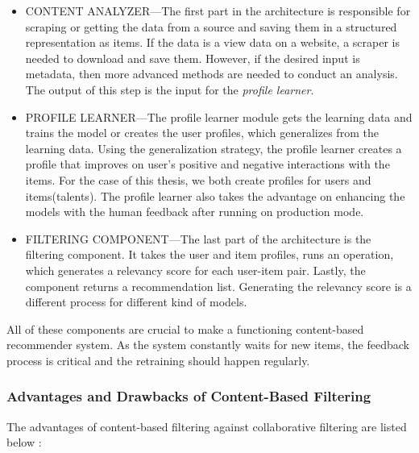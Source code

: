 \begin{itemize}
\item CONTENT ANALYZER—The first part in the architecture is responsible for scraping or getting the data from  a source and saving them in a structured representation as items. If the data is a view data on a website, a scraper is needed to download and save them. However, if the desired input is metadata, then more advanced methods are needed to conduct an analysis. The output of this step is the input for the \textit{profile learner}.
\item PROFILE LEARNER—The profile learner module gets the learning data and trains the model or creates the user profiles, which generalizes from the learning data. Using the generalization strategy, the profile learner creates a profile that improves on user's positive and negative interactions with the items. For the case of this thesis, we both create profiles for users and items(talents). The profile learner also takes the advantage on enhancing the models with the human feedback after running on production mode.
\item FILTERING COMPONENT—The last part of the architecture is the filtering component. It takes the user and item profiles, runs an operation, which generates a relevancy score for each user-item pair. Lastly, the component returns a recommendation list. Generating the relevancy score is a different process for different kind of models.
\end{itemize}

All of these components are crucial to make a functioning content-based recommender system. As the system constantly waits for new items, the feedback process is critical and the retraining should happen regularly.


\subsubsection{Advantages and Drawbacks of Content-Based Filtering}

The advantages of content-based filtering against collaborative filtering are listed below \cite{de2015semantics}:

